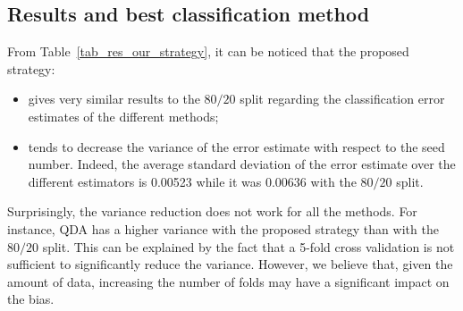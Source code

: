 \subsection{Results and best classification method}
From Table~\ref{tab_res_our_strategy}, it can be noticed that the proposed strategy:
\begin{itemize}
	\item gives very similar results to the $80/20$ split regarding the classification error estimates of the different methods;
 	\item tends to decrease the variance of the error estimate with respect to the seed number. Indeed, the average standard deviation of the error estimate over the different estimators is \num{0.00523} while it was \num{0.00636} with the $80/20$ split.
\end{itemize} 
Surprisingly, the variance reduction does not work for all the methods. For instance, QDA has a higher variance with the proposed strategy than with the $80/20$ split. 
This can be explained by the fact that a \num{5}-fold cross validation is not sufficient to significantly reduce the variance. However, we believe that, given the amount of data, increasing the number of folds may have a significant impact on the bias. 

